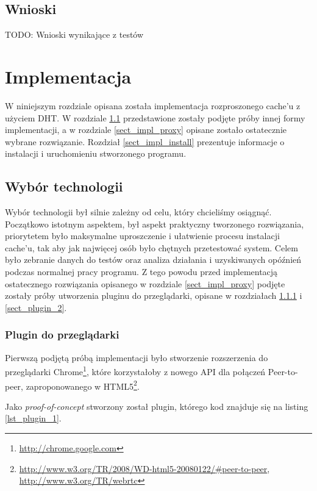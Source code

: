 \documentclass[a4paper,11pt]{scrartcl}
\newcommand{\s}{ }
\newcommand{\keszu}{cache'u}
\begin{document}
\subsection{Wnioski}
TODO: Wnioski wynikające z testów

\section{Implementacja}
W niniejszym rozdziale opisana została implementacja rozproszonego \keszu\s z użyciem DHT. W rozdziale \ref{sect_impl_technology}
przedstawione zostały podjęte próby innej formy implementacji, a w rozdziale \ref{sect_impl_proxy} opisane zostało ostatecznie wybrane rozwiązanie.
Rozdział \ref{sect_impl_install} prezentuje informacje o instalacji i uruchomieniu stworzonego programu.

\subsection{Wybór technologii}
\label{sect_impl_technology}
Wybór technologii był silnie zależny od celu, który chcieliśmy osiągnąć. Początkowo istotnym aspektem, był aspekt praktyczny tworzonego rozwiązania, priorytetem było maksymalne uproszczenie i ułatwienie procesu instalacji \keszu, tak aby jak najwięcej osób było chętnych przetestować system. Celem było zebranie danych do testów oraz analiza działania i uzyskiwanych opóźnień podczas normalnej pracy programu. Z tego powodu przed implementacją ostatecznego rozwiązania opisanego w rozdziale \ref{sect_impl_proxy} podjęte zostały próby utworzenia pluginu do przeglądarki, opisane w rozdziałach \ref{sect_plugin_1} i \ref{sect_plugin_2}.

\subsubsection{Plugin do przeglądarki}
\label{sect_plugin_1}
Pierwszą podjętą próbą implementacji było stworzenie rozszerzenia do przeglądarki Chrome\footnote{\url{http://chrome.google.com}}, które korzystałoby z nowego API dla połączeń Peer-to-peer, zaproponowanego w HTML5\footnote{\url{http://www.w3.org/TR/2008/WD-html5-20080122/#peer-to-peer}, \url{http://www.w3.org/TR/webrtc}}.

Jako \textit{proof-of-concept} stworzony został plugin, którego kod znajduje się na listing \ref{lst_plugin_1}.
\end{document}
